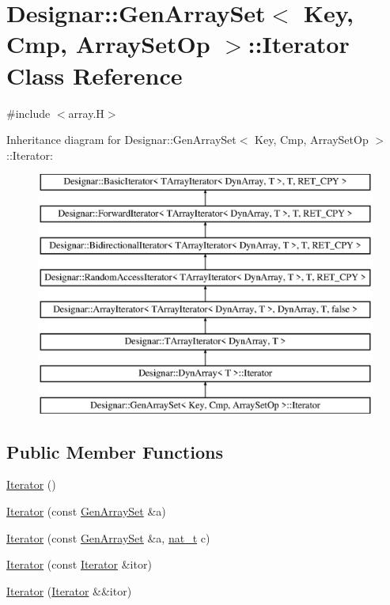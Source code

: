 \hypertarget{class_designar_1_1_gen_array_set_1_1_iterator}{}\section{Designar\+:\+:Gen\+Array\+Set$<$ Key, Cmp, Array\+Set\+Op $>$\+:\+:Iterator Class Reference}
\label{class_designar_1_1_gen_array_set_1_1_iterator}


{\ttfamily \#include $<$array.\+H$>$}

Inheritance diagram for Designar\+:\+:Gen\+Array\+Set$<$ Key, Cmp, Array\+Set\+Op $>$\+:\+:Iterator\+:\begin{figure}[H]
\begin{center}
\leavevmode
\includegraphics[height=8.000000cm]{class_designar_1_1_gen_array_set_1_1_iterator}
\end{center}
\end{figure}
\subsection*{Public Member Functions}
\begin{DoxyCompactItemize}
\item 
\hyperlink{class_designar_1_1_gen_array_set_1_1_iterator_a9f4aba730b697c071ffc51ef70db48ce}{Iterator} ()
\item 
\hyperlink{class_designar_1_1_gen_array_set_1_1_iterator_ae7870668057c79aefda6001548c550f1}{Iterator} (const \hyperlink{class_designar_1_1_gen_array_set}{Gen\+Array\+Set} \&a)
\item 
\hyperlink{class_designar_1_1_gen_array_set_1_1_iterator_a83846a50fb3a6dd02611aa331520d69a}{Iterator} (const \hyperlink{class_designar_1_1_gen_array_set}{Gen\+Array\+Set} \&a, \hyperlink{namespace_designar_aa72662848b9f4815e7bf31a7cf3e33d1}{nat\+\_\+t} c)
\item 
\hyperlink{class_designar_1_1_gen_array_set_1_1_iterator_a080025e4989fd5c3110e93e0c7c17fe2}{Iterator} (const \hyperlink{class_designar_1_1_gen_array_set_1_1_iterator}{Iterator} \&itor)
\item 
\hyperlink{class_designar_1_1_gen_array_set_1_1_iterator_aa82e1690f18b28782163e6bbb9d7d32a}{Iterator} (\hyperlink{class_designar_1_1_gen_array_set_1_1_iterator}{Iterator} \&\&itor)
\end{DoxyCompactItemize}
